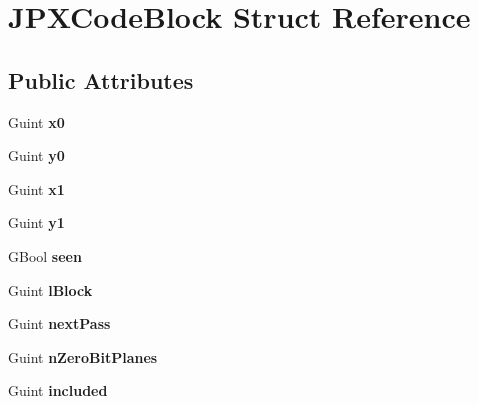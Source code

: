 \hypertarget{struct_j_p_x_code_block}{}\section{J\+P\+X\+Code\+Block Struct Reference}
\label{struct_j_p_x_code_block}
\subsection*{Public Attributes}
\begin{DoxyCompactItemize}
\item 
\mbox{\label{struct_j_p_x_code_block_a67f94914c18d32ca4ce2f48e61ec5f85}} 
Guint {\bfseries x0}
\item 
\mbox{\label{struct_j_p_x_code_block_ad33b94b2d68ecd788bf78ef287147a3d}} 
Guint {\bfseries y0}
\item 
\mbox{\label{struct_j_p_x_code_block_ae2ee06a5dc5f2b92f01cc87c64c6caa8}} 
Guint {\bfseries x1}
\item 
\mbox{\label{struct_j_p_x_code_block_abed49247149e4c1b3b2373a76ca10ae5}} 
Guint {\bfseries y1}
\item 
\mbox{\label{struct_j_p_x_code_block_a6520159934117bc8d50e5558a5ecad18}} 
G\+Bool {\bfseries seen}
\item 
\mbox{\label{struct_j_p_x_code_block_a0127fb8117e2886ac4836f571ece9246}} 
Guint {\bfseries l\+Block}
\item 
\mbox{\label{struct_j_p_x_code_block_af299451d0781681315d8a6218e5c0fdd}} 
Guint {\bfseries next\+Pass}
\item 
\mbox{\label{struct_j_p_x_code_block_afd92e61c891ee3292431625a443d1be3}} 
Guint {\bfseries n\+Zero\+Bit\+Planes}
\item 
\mbox{\label{struct_j_p_x_code_block_a508870fc29da26879e3f87a326822bf7}} 
Guint {\bfseries included}
\item 
\mbox{\label{struct_j_p_x_code_block_a92c9d7a54b96ad28a1f3502660091d3d}} 

\end{DoxyCompactItemize}

